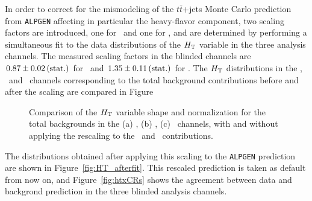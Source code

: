 In order to correct for the mismodeling of the $t\bar{t}$+jets 
Monte Carlo prediction from \texttt{ALPGEN} affecting in
particular the heavy-flavor component, two scaling factors are
introduced, one for \ttlf\ and one for \tthf, and are determined
by performing a simultaneous fit to the data distributions
of the $\HT$  variable in the three analysis channels. 
The measured scaling factors in the blinded channels are 
$0.87 \pm 0.02\,{\rm (stat.)}$ for \ttlf\ and 
$1.35 \pm 0.11\,{\rm (stat.)}$ for \tthf.
The $\HT$ distributions in the \chii, \chiii\ and \chiv\ 
channels corresponding to the total background contributions
before and after the scaling are compared in Figure
\begin{figure}[htb]\begin{center}
	\caption{Comparison of the  $\HT$  variable shape and normalization for the
        total backgrounds in the (a) \chii, (b) \chiii, (c) \chiv\ channels, with and
        without applying the rescaling to the \ttlf\ and \tthf\ contributions. \label{fig:htcomp}}
\end{center}\end{figure}
The distributions obtained after applying this scaling
to the \texttt{ALPGEN} prediction are shown in Figure~\ref{fig:HT_afterfit}.
This rescaled prediction is taken as default from now on, and
Figure~\ref{fig:htxCRs} shows the agreement between data and
backgrond prediction in the three blinded analysis channels.

